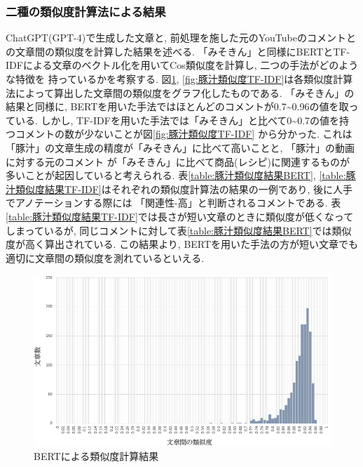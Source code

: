 \documentclass{ltjarticle}
\begin{document}
\subsubsection{二種の類似度計算法による結果}
ChatGPT(GPT-4)で生成した文章と, 前処理を施した元のYouTubeのコメントとの文章間の類似度を計算した結果を述べる. 
「みそきん」と同様にBERTとTF-IDFによる文章のベクトル化を用いてCos類似度を計算し, 二つの手法がどのような特徴を
持っているかを考察する. 
図\ref{fig:豚汁類似度BERT}, \ref{fig:豚汁類似度TF-IDF}は各類似度計算法によって算出した文章間の類似度をグラフ化したものである. 
「みそきん」の結果と同様に, BERTを用いた手法ではほとんどのコメントが0.7\sim0.96の値を取っている. 
しかし, TF-IDFを用いた手法では「みそきん」と比べて0\sim0.7の値を持つコメントの数が少ないことが図\ref{fig:豚汁類似度TF-IDF}
から分かった. これは「豚汁」の文章生成の精度が「みそきん」に比べて高いことと, 「豚汁」の動画に対する元のコメント
が「みそきん」に比べて商品(レシピ)に関連するものが多いことが起因していると考えられる. 表\ref{table:豚汁類似度結果BERT}, 
\ref{table:豚汁類似度結果TF-IDF}はそれぞれの類似度計算法の結果の一例であり, 後に人手でアノテーションする際には
「関連性-高」と判断されるコメントである. 
表\ref{table:豚汁類似度結果TF-IDF}では長さが短い文章のときに類似度が低くなってしまっているが, 
同じコメントに対して表\ref{table:豚汁類似度結果BERT}では類似度が高く算出されている. 
この結果より, BERTを用いた手法の方が短い文章でも適切に文章間の類似度を測れているといえる. 




\newpage
\begin{figure}[ht]
    \centering
    \includegraphics[width = 14.4cm]{images/豚汁images/豚汁類似度BERT.png}
    \caption{BERTによる類似度計算結果}
    \label{fig:豚汁類似度BERT}
\end{figure}
\vspace{30truept}
\end{document}
